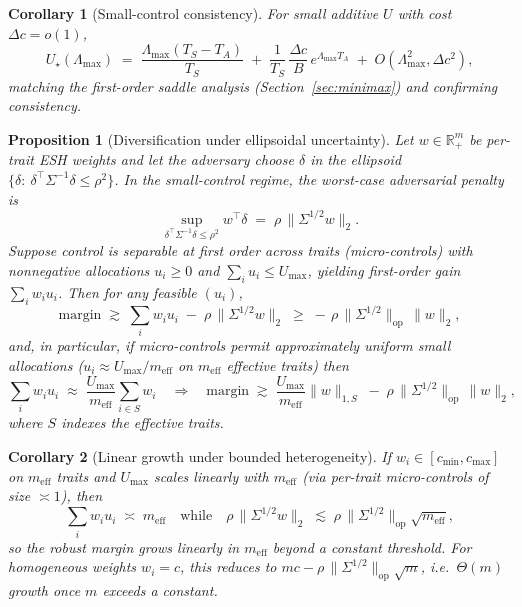 \documentclass[11pt]{article}
\theoremstyle{upright}
\newtheorem{corollary}{Corollary}
\newtheorem{proposition}{Proposition}
\newcommand{\horizon}{\Lambda}
\newcommand{\Lmax}{\horizon^{(T)}_{\max}}
\renewcommand{\Lmax}{\Lambda_{\max}}
\begin{document}
\begin{corollary}[Small-control consistency]
For small additive $U$ with cost $\Delta c=o(1)$,
\[
U_\star(\Lmax) \;=\; \frac{\Lmax(T_S-T_A)}{T_S} \;+\; \frac{1}{T_S}\,\frac{\Delta c}{B}\,e^{\Lmax T_A} \;+\; O(\Lmax^2,\Delta c^2),
\]
matching the first-order saddle analysis (Section~\ref{sec:minimax}) and confirming consistency.
\end{corollary}

\begin{proposition}[Diversification under ellipsoidal uncertainty]\label{prop:diversification}
Let $w\in\mathbb{R}^m_+$ be per-trait ESH weights and let the adversary choose $\delta$ in the ellipsoid
$\{\delta:\ \delta^\top \Sigma^{-1}\delta\le \rho^2\}$. In the small-control regime, the worst-case
adversarial penalty is
\[
\sup_{\delta^\top \Sigma^{-1}\delta\le \rho^2} w^\top \delta \;=\; \rho\,\|\Sigma^{1/2}w\|_2.
\]
Suppose control is separable at first order across traits (micro-controls) with nonnegative allocations
$u_i\ge 0$ and $\sum_i u_i\le U_{\max}$, yielding first-order gain $\sum_i w_i u_i$.
Then for any feasible $(u_i)$,
\[
\text{margin} \;\gtrsim\; \sum_i w_i u_i \;-\; \rho\,\|\Sigma^{1/2}w\|_2
\;\ge\; -\, \rho\,\|\Sigma^{1/2}\|_{\mathrm{op}}\,\|w\|_2,
\]
and, in particular, if micro-controls permit approximately uniform small allocations ($u_i\approx U_{\max}/m_{\mathrm{eff}}$ on $m_{\mathrm{eff}}$ effective traits) then
\[
\sum_i w_i u_i \;\approx\; \frac{U_{\max}}{m_{\mathrm{eff}}}\sum_{i\in S} w_i
\quad\Longrightarrow\quad
\text{margin} \;\gtrsim\; \frac{U_{\max}}{m_{\mathrm{eff}}}\|w\|_{1,S}
\;-\;\rho\,\|\Sigma^{1/2}\|_{\mathrm{op}}\,\|w\|_2,
\]
where $S$ indexes the effective traits.
\end{proposition}

\begin{corollary}[Linear growth under bounded heterogeneity]\label{cor:sqrtm}
If $w_i\in[c_{\min},c_{\max}]$ on $m_{\mathrm{eff}}$ traits and $U_{\max}$ scales linearly with $m_{\mathrm{eff}}$
(via per-trait micro-controls of size $\asymp 1$), then
\[
\sum_i w_i u_i \;\asymp\; m_{\mathrm{eff}}
\quad\text{while}\quad
\rho\,\|\Sigma^{1/2}w\|_2 \;\lesssim\; \rho\,\|\Sigma^{1/2}\|_{\mathrm{op}}\sqrt{m_{\mathrm{eff}}},
\]
so the robust margin grows \emph{linearly} in $m_{\mathrm{eff}}$ beyond a constant threshold.
For homogeneous weights $w_i=c$, this reduces to $mc - \rho\,\|\Sigma^{1/2}\|_{\mathrm{op}}\sqrt{m}$, i.e.\ $\Theta(m)$ growth once $m$ exceeds a constant.
\end{corollary}
\end{document}
